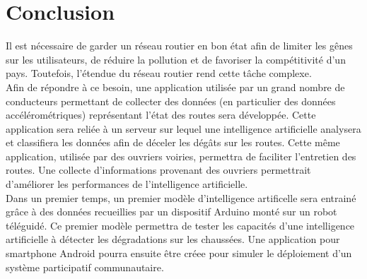 \section{Conclusion}
Il est nécessaire de garder un réseau routier en bon état afin de limiter les gênes sur les utilisateurs, de réduire la pollution et de favoriser la compétitivité d'un pays. Toutefois, l'étendue du réseau routier rend cette tâche complexe.\\

Afin de répondre à ce besoin, une application utilisée par un grand nombre de conducteurs permettant de collecter des données (en particulier des données accélérométriques) représentant l'état des routes sera développée. Cette application sera reliée à un serveur sur lequel une intelligence artificielle analysera et classifiera les données afin de déceler les dégâts sur les routes. Cette même application, utilisée par des ouvriers voiries, permettra de faciliter l'entretien des routes. Une collecte d'informations provenant des ouvriers permettrait d'améliorer les performances de l'intelligence artificielle.\\

Dans un premier temps, un premier modèle d'intelligence artificelle sera entrainé grâce à des données recueillies par un dispositif Arduino monté sur un robot téléguidé. Ce premier modèle permettra de tester les capacités d'une intelligence artificielle à détecter les dégradations sur les chaussées. Une application pour smartphone Android pourra ensuite être créee pour simuler le déploiement d'un système participatif communautaire.\\